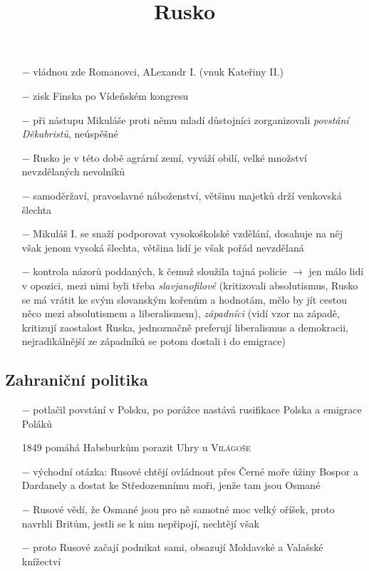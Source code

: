 \documentclass{article}
\title{\vspace{-2cm}Rusko\vspace{-1.7cm}}
\date{}
\author{}
\begin{document}
\maketitle

\begin{itemize}
    \vspace{-0.5em}
    \setlength\itemsep{0.15em}
    \item[$-$] vládnou zde Romanovci, ALexandr I. (vnuk Kateřiny II.)
    \item[$-$] zisk Finska po Vídeňském kongresu
    \item[$-$] při nástupu Mikuláše proti němu mladí důstojníci zorganizovali \textit{povstání Děkabristů}, neúspěšné
    \item[$-$] Rusko je v této době agrární zemí, vyváží obilí, velké množství nevzdělaných nevolníků
    \item[$-$] samoděržaví, pravoslavné náboženství, většinu majetků drží venkovská šlechta
    \item[$-$] Mikuláš I. se snaží podporovat vysokoškolské vzdělání, dosahuje na něj však jenom vysoká šlechta, většina lidí je však pořád nevzdělaná
    \item[$-$] kontrola názorů poddaných, k čemuž sloužila tajná policie $\rightarrow$ jen málo lidí v opozici, mezi nimi byli třeba \textit{slavjanofilové} (kritizovali absolutismus, Rusko se má vrátit ke svým slovanským kořenům a hodnotám, mělo by jít cestou něco mezi absolutismem a liberalismem), \textit{západníci} (vidí vzor na západě, kritizují zaostalost Ruska, jednoznačně preferují liberalismus a demokracii, nejradikálnější ze západníků se potom dostali i do emigrace)


\end{itemize}

\subsection*{Zahraniční politika}
\begin{itemize}
    \vspace{-0.5em}
    \setlength\itemsep{0.15em}
    \item[$-$] potlačil povstání v Polsku, po porážce nastává rusifikace Polska a emigrace Poláků
    \item[1849] pomáhá Habsburkům porazit Uhry u \textsc{Világoše}
    \item[$-$] východní otázka: Rusové chtějí ovládnout přes Černé moře úžiny Bospor a Dardanely a dostat ke Středozemnímu moři, jenže tam jsou Osmané
    \item[$-$] Rusové vědí, že Osmané jsou pro ně samotné moc velký oříšek, proto navrhli Britům, jestli se k nim nepřipojí, nechtějí však
    \item[$-$] proto Rusové začají podnikat sami, obsazují Moldavské a Valašské knížectví

\end{itemize}
\end{document}
